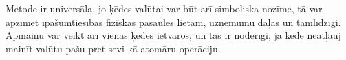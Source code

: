 Metode ir universāla, jo ķēdes valūtai var būt arī simboliska nozīme, tā var apzīmēt īpašumtiesības fiziskās pasaules lietām, uzņēmumu daļas un tamlīdzīgi.\cite{rosenfeld12}
Apmaiņu var veikt arī vienas ķēdes ietvaros, un tas ir noderīgi, ja ķēde neatļauj mainīt valūtu pašu pret sevi kā atomāru operāciju.
